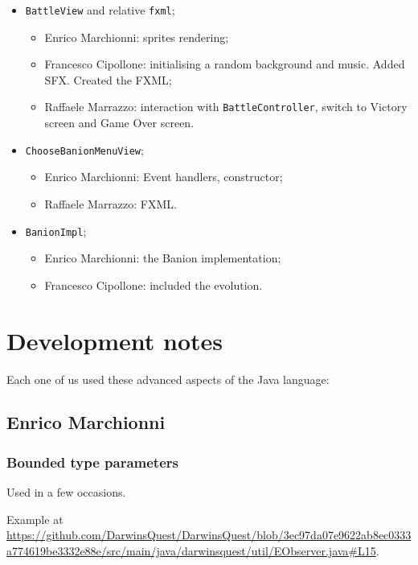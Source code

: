 \documentclass[12pt, a4paper]{report}
\theoremstyle{definition}
\begin{document}
    \begin{itemize}
        \item \verb|BattleView| and relative \verb|fxml|;
        \begin{itemize}
            \item Enrico Marchionni: sprites rendering;
            \item Francesco Cipollone: initialising a random background and music. Added SFX. Created the FXML;
            \item Raffaele Marrazzo: interaction with \verb|BattleController|, switch to Victory screen and Game Over screen.
        \end{itemize}
        \item \verb|ChooseBanionMenuView|;
        \begin{itemize}
            \item Enrico Marchionni: Event handlers, constructor;
            \item Raffaele Marrazzo: FXML.
        \end{itemize}
        \item \verb|BanionImpl|;
        \begin{itemize}
            \item Enrico Marchionni: the Banion implementation;
            \item Francesco Cipollone: included the evolution\label{multimap}.
        \end{itemize}
    \end{itemize}

\section{Development notes}

    Each one of us used these advanced aspects of the Java language:

    \subsection*{Enrico Marchionni}

        \subsubsection{Bounded type parameters}

        Used in a few occasions.

        Example at \url{https://github.com/DarwinsQuest/DarwinsQuest/blob/3ec97da07e9622ab8ec0333a774619be3332e88e/src/main/java/darwinsquest/util/EObserver.java#L15}.
\end{document}
